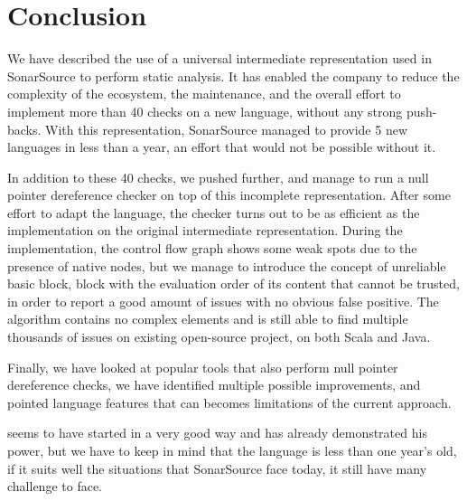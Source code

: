 \section{Conclusion}
\label{sec:conclusion}

We have described the use of a universal intermediate representation used in SonarSource to perform static analysis.
It has enabled the company to reduce the complexity of the ecosystem, the maintenance, and the overall effort to implement more than 40 checks on a new language, without any strong push-backs.
With this representation, SonarSource managed to provide 5 new languages in less than a year, an effort that would not be possible without it.

In addition to these 40 checks, we pushed \slang{} further, and manage to run a null pointer dereference checker on top of this incomplete representation. 
After some effort to adapt the language, the checker turns out to be as efficient as the implementation on the original intermediate representation.
During the implementation, the control flow graph shows some weak spots due to the presence of native nodes, but we manage to introduce the concept of unreliable basic block, block with the evaluation order of its content that cannot be trusted, in order to report a good amount of issues with no obvious false positive.
The algorithm contains no complex elements and is still able to find multiple thousands of issues on existing open-source project, on both Scala and Java.

Finally, we have looked at popular tools that also perform null pointer dereference checks, we have identified multiple possible improvements, and pointed language features that can becomes limitations of the current approach.

\slang{} seems to have started in a very good way and has already demonstrated his power, but we have to keep in mind that the language is less than one year's old, if it suits well the situations that SonarSource face today, it still have many challenge to face.
